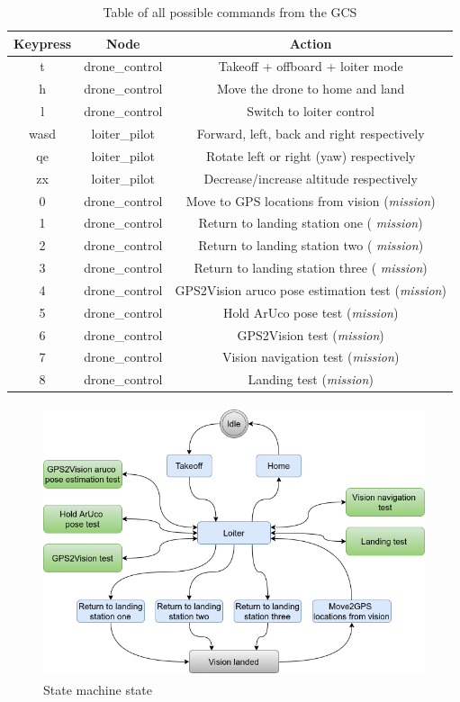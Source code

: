\documentclass[../Head/report.tex]{subfiles}
\begin{document}
\begin{table}[H]
\centering
\begin{tabular}{ccc}
\hline
\textbf{Keypress} & \textbf{Node} & \textbf{Action}                                    \\ \hline
t                 & drone\_control & Takeoff + offboard + loiter mode         \\
h                 & drone\_control & Move the drone to home and land         \\
l                 & drone\_control & Switch to loiter control 
\\
wasd              & loiter\_pilot & Forward, left, back and right respectively           \\
qe                & loiter\_pilot & Rotate left or right (yaw) respectively             \\
zx                & loiter\_pilot & Decrease/increase altitude respectively
\\
0                 & drone\_control & Move to GPS locations from vision (\textit{mission})
\\
1                 & drone\_control & Return to landing station one ( \textit{mission})
\\
2                 & drone\_control & Return to landing station two ( \textit{mission})
\\
3                 & drone\_control & Return to landing station three ( \textit{mission})
\\
4                 & drone\_control & GPS2Vision aruco pose estimation test (\textit{mission})  
\\
5                 & drone\_control & Hold ArUco pose test (\textit{mission})  
\\
6                 & drone\_control & GPS2Vision test (\textit{mission})  
\\
7                 & drone\_control & Vision navigation test (\textit{mission})
\\
8                 & drone\_control & Landing test (\textit{mission})  
\end{tabular}
\caption{Table of all possible commands from the GCS}
\label{tab:ros_commands}
\end{table}

\begin{figure}[H]
    \centering
    \includegraphics[height=8.0cm]{../Figures/state_machine_state.png}
    \caption{State machine state}
    \label{fig:state_machine_state}
\end{figure}
\end{document}
